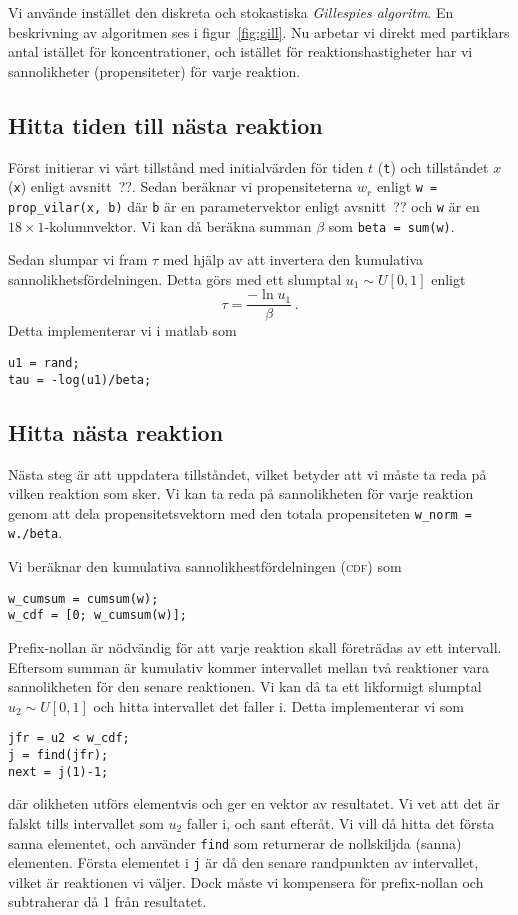 Vi använde instället den diskreta och stokastiska \emph{Gillespies algoritm}. En beskrivning av algoritmen ses i figur~\ref{fig:gill}. Nu arbetar vi
direkt med partiklars antal istället för koncentrationer, och istället för
reaktionshastigheter har vi sannolikheter (propensiteter) för varje reaktion.

\subsection{Hitta tiden till nästa reaktion}

Först initierar vi vårt tillstånd med initialvärden för tiden $t$ (\lstinline|t|) och tillståndet $x$ (\lstinline|x|) enligt avsnitt~??. Sedan beräknar vi propensiteterna $w_r$ enligt \lstinline|w = prop_vilar(x, b)| där \lstinline|b| är en parametervektor enligt avsnitt~?? och \lstinline|w| är en $18 \times 1$-kolumnvektor. Vi kan då beräkna summan $\beta$ som \lstinline|beta = sum(w)|.

Sedan slumpar vi fram $\tau$ med hjälp av att invertera den kumulativa sannolikhetsfördelningen. Detta görs med ett slumptal $u_1 \sim U[0,1]$ enligt
\begin{equation}
\tau = \frac{-\ln u_1}{\beta} \, .
\end{equation}
Detta implementerar vi i matlab som
\begin{lstlisting}
u1 = rand;
tau = -log(u1)/beta;
\end{lstlisting}

\subsection{Hitta nästa reaktion}

Nästa steg är att uppdatera tillståndet, vilket betyder att vi måste ta reda på vilken reaktion som sker. Vi kan ta reda på sannolikheten för varje reaktion genom att dela propensitetsvektorn med den totala propensiteten \lstinline|w_norm = w./beta|. 

Vi beräknar den kumulativa sannolikhestfördelningen (\textsc{cdf}) som\begin{lstlisting}
w_cumsum = cumsum(w);
w_cdf = [0; w_cumsum(w)];
\end{lstlisting}
Prefix-nollan är nödvändig för att varje reaktion skall företrädas av ett intervall. Eftersom summan är kumulativ kommer intervallet mellan två reaktioner vara sannolikheten för den senare reaktionen. Vi kan då ta ett likformigt slumptal $u_2 \sim U[0,1]$ och hitta intervallet det faller i. Detta implementerar vi som
\begin{lstlisting}
jfr = u2 < w_cdf;
j = find(jfr);
next = j(1)-1;
\end{lstlisting}
där olikheten utförs elementvis och ger en vektor av resultatet. Vi vet att det är falskt tills intervallet som $u_2$ faller i, och sant efteråt. Vi vill då hitta det första sanna elementet, och använder \lstinline|find| som returnerar de nollskiljda (sanna) elementen. Första elementet i \lstinline|j| är då den senare randpunkten av intervallet, vilket är reaktionen vi väljer. Dock måste vi kompensera för prefix-nollan och subtraherar då 1 från resultatet.

